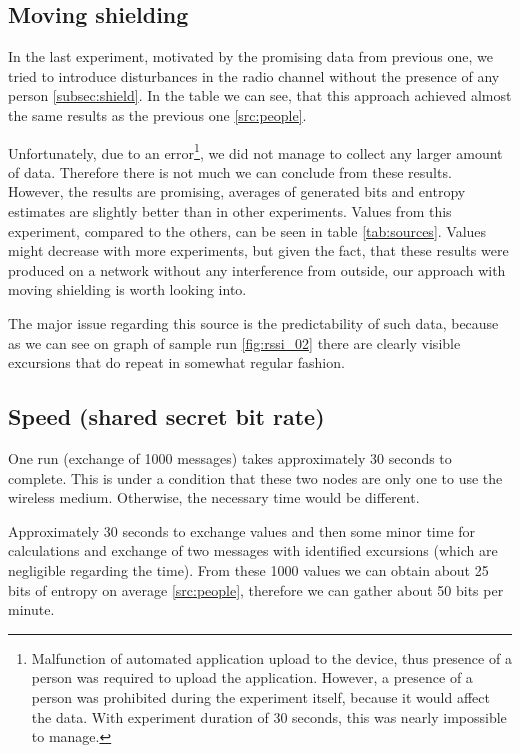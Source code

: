 \documentclass[
  print, %
  Table,   %
  nolof,     %
  nolot,     %
           oneside
]{fithesis3}
\begin{document}
  \subsection{Moving shielding}\label{src:shield}
  In the last experiment, motivated by the promising data from previous one, we tried to introduce disturbances in the radio channel without the presence of any person \ref{subsec:shield}. In the table we can see, that this approach achieved almost the same results as the previous one \ref{src:people}.

  Unfortunately, due to an error\footnote{Malfunction of automated application upload to the device, thus presence of a person was required to upload the application. However, a presence of a person was prohibited during the experiment itself, because it would affect the data. With experiment duration of 30 seconds, this was nearly impossible to manage.}, we did not manage to collect any larger amount of data. Therefore there is not much we can conclude from these results. However, the results are promising, averages of generated bits and entropy estimates are slightly better than in other experiments. Values from this experiment, compared to the others, can be seen in table \ref{tab:sources}. Values might decrease with more experiments, but given the fact, that these results were produced on a network without any interference from outside, our approach with moving shielding is worth looking into.

  The major issue regarding this source is the predictability of such data, because as we can see on graph of sample run \ref{fig:rssi_02}
  there are clearly visible excursions that do repeat in somewhat regular fashion.


  \subsection{Speed (shared secret bit rate)}
  One run (exchange of 1000 messages) takes approximately 30 seconds to complete. This is under a condition that these two nodes are only one to use the wireless medium. Otherwise, the necessary time would be different.

  Approximately 30 seconds to exchange values and then some minor time for calculations and exchange of two messages with identified excursions (which are negligible regarding the time).  From these 1000 values we can obtain about 25 bits of entropy on average \ref{src:people}, therefore we can gather about 50 bits per minute.
\end{document}
